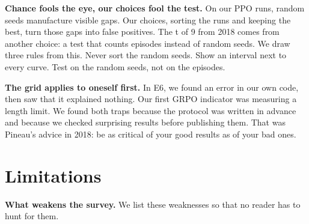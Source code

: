 \documentclass[11pt,a4paper]{article}
\begin{document}
\textbf{Chance fools the eye, our choices fool the test.} On our PPO
runs, random seeds manufacture visible gaps. Our choices, sorting the
runs and keeping the best, turn those gaps into false positives. The t
of 9 from 2018 comes from another choice: a test that counts episodes
instead of random seeds. We draw three rules from this. Never sort the
random seeds. Show an interval next to every curve. Test on the random
seeds, not on the episodes.

\textbf{The grid applies to oneself first.} In E6, we found an error in
our own code, then saw that it explained nothing. Our first GRPO
indicator was measuring a length limit. We found both traps because the
protocol was written in advance and because we checked surprising
results before publishing them. That was Pineau's advice in 2018: be as
critical of your good results as of your bad ones.

\section{Limitations}\label{limitations}

\textbf{What weakens the survey.} We list these weaknesses so that no
reader has to hunt for them.
\end{document}

